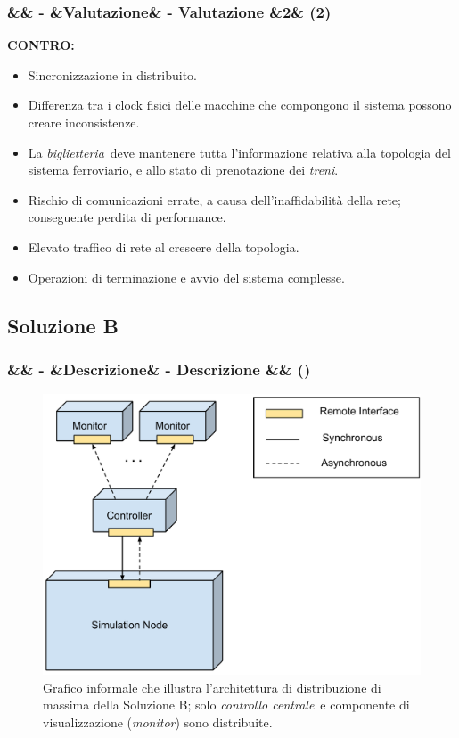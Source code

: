 \documentclass[slidestop,compress,blackandwhite]{beamer}
\newcommand{\ii}[1]{\textit{#1}}
\newcommand{\treni}{\ii{treni}}
\newcommand{\biglietteria}{\ii{biglietteria}}
\newcommand{\controller}{\ii{controllo centrale}}
\newcommand{\CONTRO}{\textbf{CONTRO:}}
\newcommand{\newtitle}[4]{
	#1 
	\ifx&#2&%
	\else
  		\large- #2
	\fi
	\ifx&#3&%
	\else
  		\normalsize- #3
	\fi
	\ifx&#4&%
	\else
  		\normalsize (#4)
	\fi
}
\newcommand{\newframe}[5]{
	\begin{frame}
		\frametitle{\newtitle{#1}{#2}{#3}{#4}}
		#5
	\end{frame}
}
\begin{document}
	\newframe{}{}{Valutazione}{2}{
		\CONTRO
			\begin{itemize}
				\item Sincronizzazione in distribuito.
				\item Differenza tra i clock fisici delle macchine che compongono il sistema possono creare inconsistenze.
				\item La \biglietteria~deve mantenere tutta l'informazione relativa alla topologia del sistema ferroviario, e allo stato di prenotazione dei \treni.
				\item Rischio di comunicazioni errate, a causa dell'inaffidabilità della rete; conseguente perdita di performance. 
				\item Elevato traffico di rete al crescere della topologia.
				\item Operazioni di terminazione e avvio del sistema complesse.
			\end{itemize}
	}
	
	\subsection{Soluzione B}\label{sol_b}
	\newframe{}{}{Descrizione}{}{
		\begin{figure}
			\includegraphics[scale=0.22,trim=0mm 0mm 0mm 0mm]{imgs/nothing_distributed.pdf}
			\caption{\small Grafico informale che illustra l'architettura di distribuzione di massima della Soluzione B; solo \controller~e componente di visualizzazione (\ii{monitor}) sono distribuite.}
		\end{figure}
		
	}
	
\end{document}
